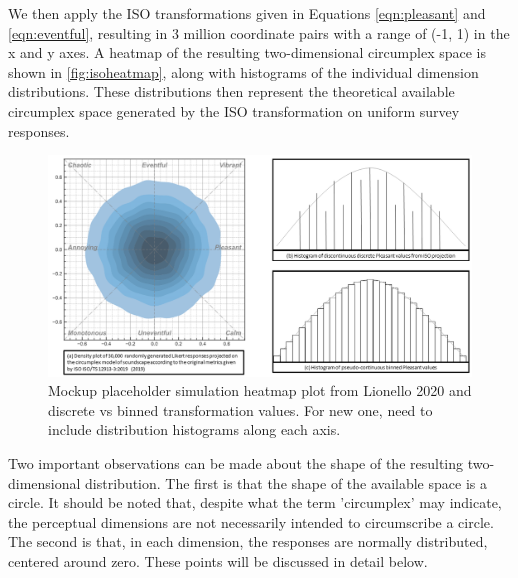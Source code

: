 We then apply the ISO transformations given in Equations \ref{eqn:pleasant} and \ref{eqn:eventful}, resulting in 3 million coordinate pairs with a range of (-1, 1) in the x and y axes. A heatmap of the resulting two-dimensional circumplex space is shown in \autoref{fig:isoheatmap}, along with histograms of the individual dimension distributions. These distributions then represent the theoretical available circumplex space generated by the ISO transformation on uniform survey responses.

\begin{figure}
  \includegraphics[width=\textwidth]{figures/Combined_sim_hist_mockup.png}
  \caption{Mockup placeholder simulation heatmap plot from Lionello 2020 and discrete vs binned transformation values. For new one, need to include distribution histograms along each axis.%
    \label{fig:isoheatmap}
  }
\end{figure}

Two important observations can be made about the shape of the resulting two-dimensional distribution. The first is that the shape of the available space is a circle. It should be noted that, despite what the term 'circumplex' may indicate, the perceptual dimensions are not necessarily intended to circumscribe a circle. The second is that, in each dimension, the responses are normally distributed, centered around zero. These points will be discussed in detail below.

